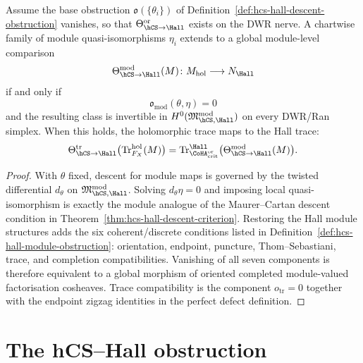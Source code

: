 \begin{theorem}
\label{thm:hcs-hall-module-comparison-criterion}
Assume the base obstruction
$\mathfrak o(\{\theta_i\})$ of
Definition~\ref{def:hcs-hall-descent-obstruction} vanishes, so that
$\Theta_{\hCS\to\Hall}^{\mathrm{or}}$ exists on the DWR nerve. A
chartwise family of module quasi-isomorphisms $\eta_i$ extends to a
global module-level comparison
\[
 \Theta_{\hCS\to\Hall}^{\mathrm{mod}}(M)\colon
 M_{\mathrm{hol}}\longrightarrow N_{\Hall}
\]
if and only if
\[
 \mathfrak o_{\mathrm{mod}}(\theta,\eta)=0
\]
and the resulting class is invertible in
$H^0(\mathfrak M_{\hCS,\Hall}^{\mathrm{mod}})$ on every DWR/Ran
simplex. When this holds, the holomorphic trace maps to the Hall trace:
\[
 \Theta_{\hCS\to\Hall}^{\mathrm{tr}}
 \bigl(\mathrm{Tr}_{F_X}^{\mathrm{hol}}(M)\bigr)
 =
 \mathrm{Tr}_{\CoHA_{\mathrm{crit}}^{\mathrm{or}}}^{\Hall}
 \bigl(\Theta_{\hCS\to\Hall}^{\mathrm{mod}}(M)\bigr).
\]
\end{theorem}

\begin{proof}
With $\theta$ fixed, descent for module maps is governed by the twisted
differential $d_\theta$ on
$\mathfrak M_{\hCS,\Hall}^{\mathrm{mod}}$. Solving
$d_\theta\eta=0$ and imposing local quasi-isomorphism is exactly the
module analogue of the Maurer--Cartan descent condition in
Theorem~\ref{thm:hcs-hall-descent-criterion}. Restoring the Hall
module structures adds the six coherent/discrete conditions listed in
Definition~\ref{def:hcs-hall-module-obstruction}: orientation,
endpoint, puncture, Thom--Sebastiani, trace, and completion
compatibilities. Vanishing of all seven components is therefore
equivalent to a global morphism of oriented completed module-valued
factorisation cosheaves. Trace compatibility is the component
$o_{\mathrm{tr}}=0$ together with the endpoint zigzag identities in the
perfect defect definition.
\end{proof}

\section{The hCS--Hall obstruction}
\label{sec:cy3-chain-level-bridge-missing-lemma}


